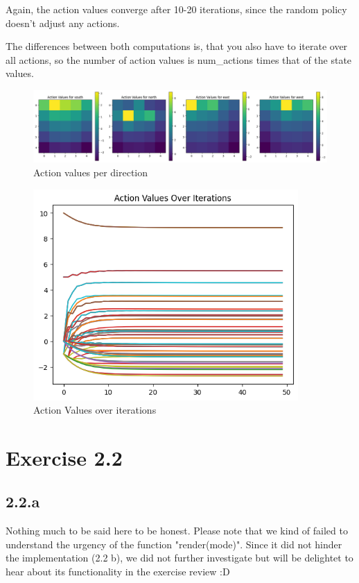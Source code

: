 \documentclass{article} %
\begin{document}
	Again, the action values converge after 10-20 iterations, since the random policy doesn't adjust any actions. 

	The differences between both computations is, that you also have to iterate over all actions, so the number of action values is num\_actions times that of the state values. 
	\newline
	
	\begin{figure}[h!]
		\centering
		\includegraphics[width=1\textwidth]{images/action_values_per_direction.png}
		\caption{Action values per direction}
		\label{fig:3}
	\end{figure}
	
		\begin{figure}[h!]
		\centering
		\includegraphics[width=0.9\textwidth]{images/action_values.png}
		\caption{Action Values over iterations}
		\label{fig:4}
	\end{figure}
	
	
	
	
	\section{Exercise 2.2}
	\subsection{2.2.a}
	Nothing much to be said here to be honest. Please note that we kind of failed to understand the urgency of the function "render(mode)". Since it did not hinder the implementation (2.2 b), we did not further investigate but will be delightet to hear about its functionality in the exercise review :D 
	
\end{document}
